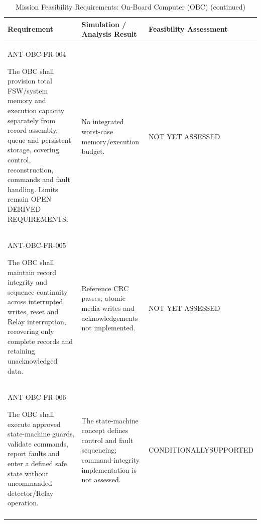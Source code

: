 \begin{table}[H]\centering\small\setlength{\tabcolsep}{3pt}
\ContinuedFloat\captionsetup{list=no}
\caption{Mission Feasibility Requirements: On-Board Computer (OBC) (continued)}
\begin{tabular}{@{}
>{\RaggedRight\arraybackslash}p{}
>{\RaggedRight\arraybackslash}p{}
>{\RaggedRight\arraybackslash}p{}
@{}}
\toprule Requirement & Simulation / Analysis Result & Feasibility Assessment\\\midrule
{}\label{req:ANT-OBC-FR-004}\mbox{ANT-OBC-}\newline\mbox{FR-004}\par The OBC shall provision total FSW/system memory and execution capacity separately from record assembly, queue and persistent storage, covering control, reconstruction, commands and fault handling. Limits remain OPEN DERIVED REQUIREMENTS. & No integrated worst-case memory/execution budget. & NOT YET ASSESSED\\
\addlinespace[3pt]
\label{req:ANT-OBC-FR-005}\mbox{ANT-OBC-}\newline\mbox{FR-005}\par The OBC shall maintain record integrity and sequence continuity across interrupted writes, reset and Relay interruption, recovering only complete records and retaining unacknowledged data. & Reference CRC passes; atomic media writes and acknowledgements not implemented. & NOT YET ASSESSED\\
\addlinespace[3pt]
\label{req:ANT-OBC-FR-006}\mbox{ANT-OBC-}\newline\mbox{FR-006}\par The OBC shall execute approved state-machine guards, validate commands, report faults and enter a defined safe state without uncommanded detector/Relay operation. & The state-machine concept defines control and fault sequencing; command-integrity implementation is not assessed. & CONDITIONALLY\newline SUPPORTED\\
\addlinespace[3pt]
\bottomrule
\end{tabular}
\end{table}
